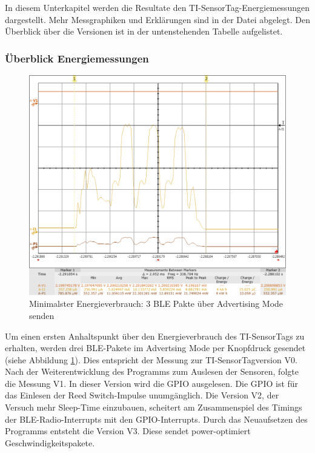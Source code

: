 In diesem Unterkapitel werden die Resultate den TI-SensorTag-Energiemessungen dargestellt. Mehr Messgraphiken und Erklärungen sind in der Datei  abgelegt. Den Überblick über die Versionen ist in der untenstehenden Tabelle aufgelistet. 


\subsubsection{Überblick Energiemessungen}
\label{erst_EMessungen}

\begin{figure}[ht]
    \includegraphics[width=1.0\textwidth]{3Vorgehen/imag/v0Send33uJ.png} 
    \caption{Minimalster Energieverbrauch: 3 BLE Pakte über Advertising Mode senden}
    \label{BLE_send}
\end{figure}

Um einen ersten Anhaltspunkt über den Energieverbrauch des TI-SensorTags zu erhalten, werden drei BLE-Pakete im Advertsing Mode per Knopfdruck gesendet (siehe Abbildung \ref{BLE_send}). Dies entspricht der Messung zur TI-SensorTagversion V0. Nach der Weiterentwicklung des Programms zum Auslesen der Sensoren, folgte die Messung V1. In dieser Version wird die GPIO ausgelesen. Die GPIO ist für das Einlesen der Reed Switch-Impulse unumgänglich. Die Version V2, der Versuch mehr Sleep-Time einzubauen, scheitert am Zusammenspiel des Timings der BLE-Radio-Interrupts mit den GPIO-Interrupts. Durch das Neuaufsetzen des Programms entsteht die Version V3. Diese sendet power-optimiert Geschwindigkeitspakete. 

